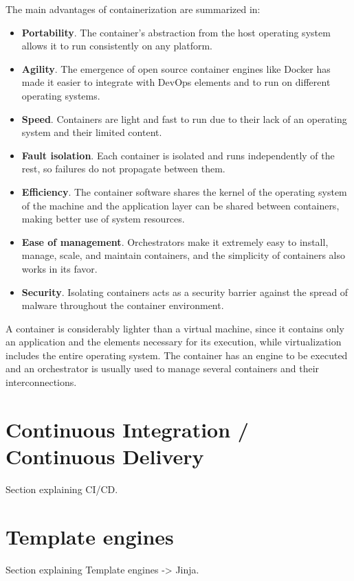 \nonzeroparskip The main advantages of containerization are summarized in:
\begin{itemize}
	\item \textbf{Portability}. The container's abstraction from the host operating system allows it to run consistently on any platform.
	\item \textbf{Agility}. The emergence of open source container engines like Docker has made it easier to integrate with DevOps elements and to run on different operating systems.
	\item \textbf{Speed}. Containers are light and fast to run due to their lack of an operating system and their limited content.
	\item \textbf{Fault isolation}. Each container is isolated and runs independently of the rest, so failures do not propagate between them.
	\item \textbf{Efficiency}. The container software shares the kernel of the operating system of the machine and the application layer can be shared between containers, making better use of system resources.
	\item \textbf{Ease of management}. Orchestrators make it extremely easy to install, manage, scale, and maintain containers, and the simplicity of containers also works in its favor.
	\item \textbf{Security}. Isolating containers acts as a security barrier against the spread of malware throughout the container environment.
	\end{itemize}

\nonzeroparskip A container is considerably lighter than a virtual machine, since it contains only an application and the elements necessary for its execution, while virtualization includes the entire operating system. The container has an engine to be executed and an orchestrator is usually used to manage several containers and their interconnections.

\section{Continuous Integration / Continuous Delivery}

\nonzeroparskip Section explaining CI/CD.

\section{Template engines}

\nonzeroparskip Section explaining Template engines -> Jinja.

